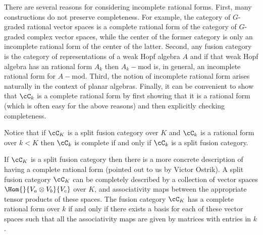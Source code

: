 
There are several reasons for considering incomplete rational forms.  First, many constructions do not preserve completeness.  For example, the category of $G$-graded rational vector spaces is a complete rational form of the category of $G$-graded complex vector spaces, while the center of the former category is only an incomplete rational form of the center of the latter.  Second, any fusion category is the category of representations of a weak Hopf algebra $A$ \cite{MR1976459, 0206113, 9904073, MR2522429} and if that weak Hopf algebra has an rational form $A_k$ then $A_k-\text{mod}$ is, in general, an incomplete rational form for $A-\text{mod}$.  Third, the notion of incomplete rational form arises naturally in the context of planar algebras.  Finally, it can be convenient to show that $\cC_k$ is a complete rational form by first showing that it is a rational form (which is often easy for the above reasons) and then explicitly checking completeness.

Notice that if $\cC_K$ is a split fusion category over $K$ and $\cC_k$ is a rational form over $k < K$ then $\cC_k$ is complete if and only if $\cC_k$ is a split fusion category.


If $\cC_K$ is a split fusion category then there is a more concrete description of having a complete rational form (pointed out to us by Victor Ostrik).  A split fusion category $\cC_K$ can be completely described by a collection of vector spaces $\Hom{}{V_a \otimes V_b}{V_c}$ over $K$, and associativity maps between the appropriate tensor products of these spaces.   The fusion category $\cC_K$ has a complete rational form over $k$ if and only if there exists a basis for each of these vector spaces such that all the associativity maps are given by matrices with entries in $k$.

